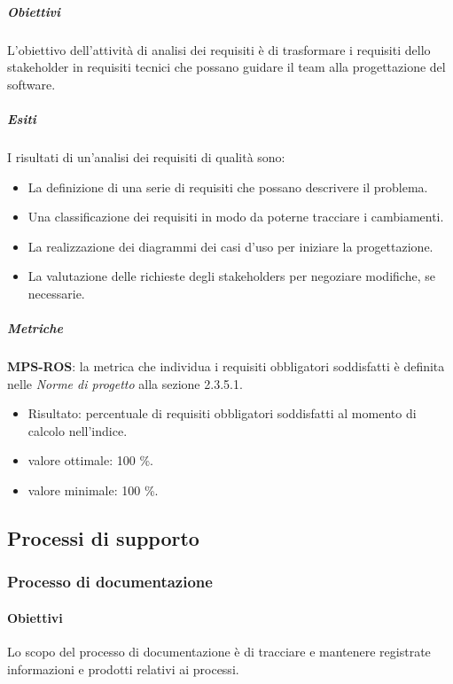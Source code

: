 \documentclass[../piano-di-qualifica.tex]{subfiles}
\begin{document}
\subparagraph{Obiettivi}%
\label{par:obiettivi}
L'obiettivo dell'attività di analisi dei requisiti è di trasformare i requisiti dello stakeholder in requisiti tecnici che possano guidare il team alla progettazione del software.

\subparagraph{Esiti}%
\label{par:esiti}
I risultati di un'analisi dei requisiti di qualità sono:
\begin{itemize}
  \item La definizione di una serie di requisiti che possano descrivere il problema.
  \item Una classificazione dei requisiti in modo da poterne tracciare i cambiamenti.
  \item La realizzazione dei diagrammi dei casi d'uso per iniziare la progettazione.
  \item La valutazione delle richieste degli stakeholders per negoziare modifiche, se necessarie.
\end{itemize}

\subparagraph{Metriche}%
\label{par:metriche}

\textbf{MPS-ROS}: la metrica che individua i requisiti obbligatori soddisfatti è definita nelle \textit{Norme di progetto} alla sezione 2.3.5.1.
\begin{itemize}
  \item Risultato: percentuale di requisiti obbligatori soddisfatti al momento di calcolo nell'indice.
  \item valore ottimale: 100 \%.
  \item valore minimale: 100 \%.
\end{itemize}

\subsection{Processi di supporto}%
\label{sub:processi_di_supporto}

\subsubsection{Processo di documentazione}%
\label{subs:processo_di_documentazione}

\paragraph{Obiettivi}%
\label{par:obiettivi_doc}
Lo scopo del processo di documentazione è di tracciare e mantenere registrate informazioni e prodotti relativi ai processi.
\end{document}
